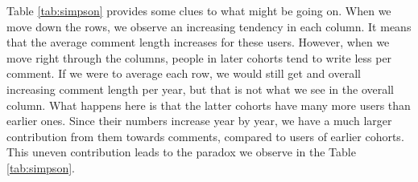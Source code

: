 

Table \ref{tab:simpson} provides some clues to what might be going on. When we move down the rows, we observe an increasing tendency in each column. It means that the average comment length increases for these users. However, when we move right through the columns, people in later cohorts tend to write less per comment. If we were to average each row, we would still get and overall increasing comment length per year, but that is not what we see in the overall column. What happens here is that the latter cohorts have many more users than earlier ones. Since their numbers increase year by year, we have a  much larger contribution from them towards comments, compared to users of earlier cohorts. This uneven contribution leads to the paradox we observe in the Table \ref{tab:simpson}. 


